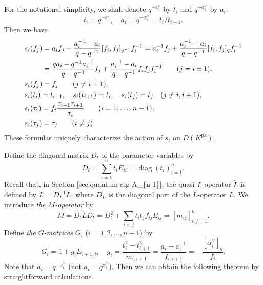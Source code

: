 \documentclass[12pt,twoside]{article}
\newcommand\tL{{\widetilde L}}
\newcommand\av{\alpha^\vee}
\newcommand\eps{\varepsilon}
\newcommand\epsv{\eps^\vee}
\newcommand\pa{{\mathrm{pa}}}
\newcommand\diag{\mathop{\mathrm{diag}}\nolimits}
\theoremstyle{plain} %
\theoremstyle{definition} %
\theoremstyle{definition} %
\numberwithin{theorem}{section}
\numberwithin{equation}{section}
\numberwithin{figure}{section}
\numberwithin{table}{section}
\newcommand\secref[1]{Section \ref{#1}}
\begin{document}
For the notational simplicity, we shall denote $q^{-\epsv_i}$ by $t_i$
and $q^{-\av_i}$ by $a_i$:
\begin{equation*}
 t_i = q^{-\epsv_i}, \quad 
 a_i = q^{-\av_i} = t_i/t_{i+1}.
\end{equation*}
Then we have
\begin{align}
  &
  s_i(f_j)
  = a_i      f_j + \frac{a_i^{-1}-a_i}{q-q^{-1}} [f_i,f_j]_{q^{-1}} f_i^{-1}
  = a_i^{-1} f_j + \frac{a_i^{-1}-a_i}{q-q^{-1}} [f_i,f_j]_q        f_i^{-1}
 \notag
 \\ &
  \hphantom{s_i(f_j)}
  = \frac{q a_i-q^{-1}a_i^{-1}}{q-q^{-1}} f_j 
  + \frac{a_i^{-1}-a_i}{q-q^{-1}} f_i f_j f_i^{-1}
  \qquad (j=i\pm1), 
 \label{eq:s_i(f_j)-1}
 \\ &
  s_i(f_j) = f_j 
  \qquad (j\ne i\pm 1),
 \label{eq:s_i(f_j)-2}
 \\ &
  s_i(t_i) = t_{i+1}, \quad
  s_i(t_{i+1}) = t_i, \quad
  s_i(t_j) = t_j \quad (j\ne i,i+1),
 \label{eq:s_i(t_j)}
 \\ &
  s_i(\tau_i) 
  = f_i\frac{\tau_{i-1}\tau_{i+1}}{\tau_i} 
  \qquad (i=1,\ldots,n-1),
 \notag
 \\ & 
  s_i(\tau_j) = \tau_j
  \qquad (i\ne j).
 \notag 
\end{align}
These formulas uniquely characterize the action of $s_i$ on $D(K^\pa)$.

Define the diagonal matrix $D_t$ of the parameter variables by 
\begin{equation*}
 D_t = \sum_{i=1}^n t_i E_{ii} = \diag(t_i)_{i=1}^n.
\end{equation*}
Recall that, in \secref{sec:quantum-alg-A_{n-1}}, 
the quasi $L$-operator $\tL$ is defined by $\tL=D_L^{-1}L$, 
where $D_L$ is the diagonal part of the $L$-operator $L$.
We introduce {\em the $M$-operator} by
\begin{equation*}
 M = D_t \tL D_t 
   = D_t^2 + \sum_{i<j}t_i t_j f_{ij}E_{ij}
   = [m_{ij}]_{i,j=1}^n.
\end{equation*}
Define {\em the $G$-matrices} $G_i$ ($i=1,2,\ldots,n-1$) by
\begin{equation*}
 G_i = 1 + g_i E_{i+1,i}, \quad
 g_i = \frac{t_i^2-t_{i+1}^2}{m_{i,i+1}}
     = \frac{a_i-a_i^{-1}}{f_{i,i+1}}
     = -\frac{[\av_i]_q}{f_i}.
\end{equation*}
Note that $a_i=q^{-\av_i}$ (not $a_i=q^{\av_i}$).
Then we can obtain the following theorem by straightforward calculations.
\end{document}
